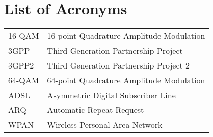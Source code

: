 \documentclass [12pt,letterpaper]{report}
\begin{document}
\newpage
\chapter*{List of Acronyms}

\begin{longtable}{ll}
  16-QAM   &  16-point Quadrature Amplitude Modulation\\
  3GPP     &  Third Generation Partnership Project\\
  3GPP2    &  Third Generation Partnership Project 2\\
  64-QAM   &  64-point Quadrature Amplitude Modulation\\
  ADSL     &  Asymmetric Digital Subscriber Line\\
  ARQ      &  Automatic Repeat Request\\
  WPAN     &  Wireless Personal Area Network
\end{longtable}

\cleardoublepage
{}

\typeout{}


\typeout{}


\typeout{}


\appendix

\typeout{}


\typeout{}
\begin{singlespace}
  
  
\end{singlespace}
\end{document}
